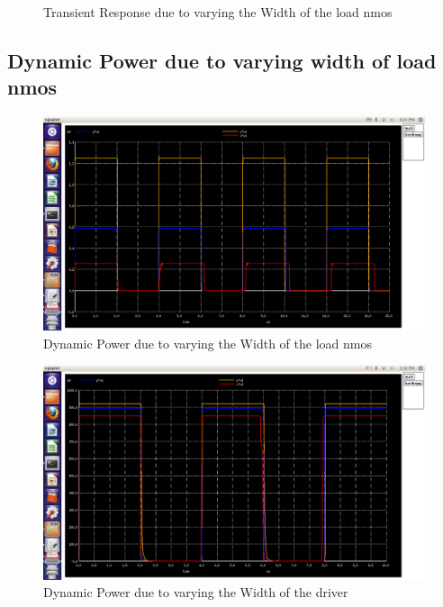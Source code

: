 \documentclass[12pt,a4paper]{article}
\begin{document}
\begin{center}
\begin{figure}[!ht]
\caption[Short]{Transient Response due to varying the Width of the load nmos}
\end{figure}

\subsection{Dynamic Power due to varying width of load nmos}
\begin{figure}[!ht]
\centering
\includegraphics[scale=0.37]{lab4_pic4_6_6_dynamic_power_dueto_varing_Wof_loadnmos.png}

\caption[Short]{Dynamic Power due to varying the Width of the load nmos}
\end{figure}

\begin{figure}[!ht]
\centering
\includegraphics[scale=0.37]{lab4_pic4_10_dynamic_power_dueto_varing_Wof_driver.png}

\caption[Short]{Dynamic Power due to varying the Width of the driver}
\end{figure}
\clearpage

\end{center}
\end{document}
